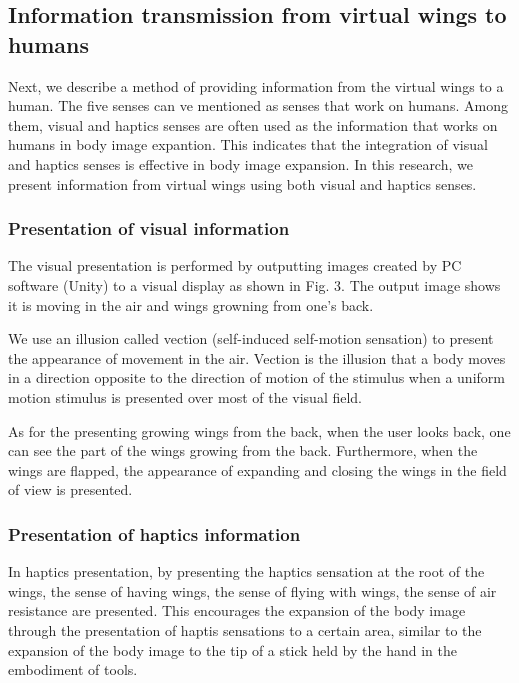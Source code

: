\documentclass[letterpaper, 10 pt, conference]{ieeeconf}  %
\begin{document}
        \subsection{Information transmission from virtual wings to humans}
                Next, we describe a method of providing information from the virtual wings to a human. 
                The five senses can ve mentioned as senses that work on humans.
                Among them, visual and haptics senses are often used as the information that works on humans in body image expantion.  
                This indicates that the integration of visual and haptics senses is effective in body image expansion. 
                In this research, we present information from virtual wings using both visual and haptics senses.  

                \subsubsection{Presentation of visual information}
                

                        The visual presentation is performed by outputting images created by PC software (Unity) to a visual display as shown in Fig. 3. 
                        The output image shows it is moving in the air and wings growning from one's back.

                        We use an illusion called vection (self-induced self-motion sensation) to present the appearance of movement in the air\cite{bhalla1999visual}.
                        Vection is the illusion that a body moves in a direction opposite to the direction of motion of the stimulus when a uniform motion stimulus is presented over most of the visual field.  
                        
                        As for the presenting growing wings from the back, when the user looks back, one can see the part of the wings growing from the back.
                        Furthermore, when the wings are flapped, the appearance of expanding and closing the wings in the field of view is presented.

                \subsubsection{Presentation of haptics information}
                        In haptics presentation, by presenting the haptics sensation at the root of the wings, the sense of having wings, the sense of flying with wings, the sense of air resistance are presented.  
                        This encourages the expansion of the body image through the presentation of haptis sensations to a certain area, similar to the expansion of the body image to the tip of a stick held by the hand in the embodiment of tools.
\end{document}

